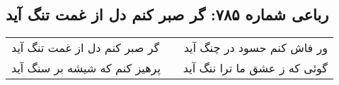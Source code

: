 \begin{center}
\section*{رباعی شماره ۷۸۵: گر صبر کنم دل از غمت تنگ آید}
\label{sec:0785}
\begin{longtable}{l p{0.5cm} r}
گر صبر کنم دل از غمت تنگ آید
&&
ور فاش کنم حسود در چنگ آید
\\
پرهیز کنم که شیشه بر سنگ آید
&&
گوئی که ز عشق ما ترا ننگ آید
\\
\end{longtable}
\end{center}
